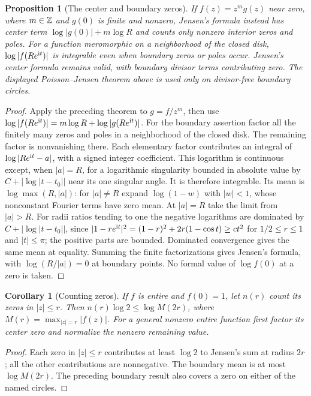 \documentclass[11pt,a4paper,openany]{book}
\newtheorem{proposition}[theorem]{Proposition}
\newtheorem{corollary}[theorem]{Corollary}
\theoremstyle{definition}
\theoremstyle{remark}\newtheorem{remark}[theorem]{Remark}
\newcommand{\family}[1]{}
\begin{document}
\begin{proposition}[The center and boundary zeros]\label{d12:17-02}\family{D12.17.02}
If $f(z)=z^m g(z)$ near zero, where $m\in\mathbb Z$ and $g(0)$ is finite and
nonzero, Jensen's formula instead has center term
$\log|g(0)|+m\log R$ and counts only nonzero interior zeros and poles.
For a function meromorphic on a neighborhood of the closed disk,
$\log|f(Re^{\mathrm i t})|$ is integrable even when boundary zeros or poles
occur. Jensen's center formula remains valid, with boundary divisor
terms contributing zero. The displayed Poisson--Jensen theorem above
is used only on divisor-free boundary circles.
\end{proposition}
\begin{proof}
Apply the preceding theorem to $g=f/z^m$, then use
$\log|f(Re^{\mathrm i t})|=m\log R+\log|g(Re^{\mathrm i t})|$.
For the boundary assertion factor all the finitely many zeros and poles
in a neighborhood of the closed disk. The remaining factor is
nonvanishing there. Each elementary factor contributes an integral of
$\log|Re^{\mathrm i t}-a|$, with a signed integer coefficient. This logarithm
is continuous except, when $|a|=R$, for a logarithmic singularity bounded
in absolute value by $C+|\log|t-t_0||$ near its one singular angle.
It is therefore integrable. Its mean is $\log\max(R,|a|)$: for
$|a|\ne R$ expand $\log(1-w)$ with $|w|<1$, whose nonconstant Fourier
terms have zero mean. At $|a|=R$ take the limit from $|a|>R$.
For radii ratios tending to one the negative logarithms are dominated
by $C+|\log|t-t_0||$, since
$|1-re^{\mathrm i t}|^2=(1-r)^2+2r(1-\cos t)\ge c t^2$ for
$1/2\le r\le1$ and $|t|\le\pi$; the positive parts are bounded.
Dominated convergence gives the same mean at equality. Summing the
finite factorizations gives Jensen's formula, with $\log(R/|a|)=0$
at boundary points. No formal value of $\log f(0)$ at a zero is taken.
\end{proof}

\begin{corollary}[Counting zeros]\label{d12:17-03}\family{D12.17.03}
If $f$ is entire and $f(0)=1$, let $n(r)$ count its zeros in $|z|\le r$.
Then $n(r)\log2\le\log M(2r)$, where
$M(r)=\max_{|z|=r}|f(z)|$. For a general nonzero entire function first
factor its center zero and normalize the nonzero remaining value.
\end{corollary}
\begin{proof}
Each zero in $|z|\le r$ contributes at least $\log2$ to Jensen's sum
at radius $2r$; all the other contributions are nonnegative. The
boundary mean is at most $\log M(2r)$. The preceding boundary result
also covers a zero on either of the named circles.
\end{proof}
\end{document}

